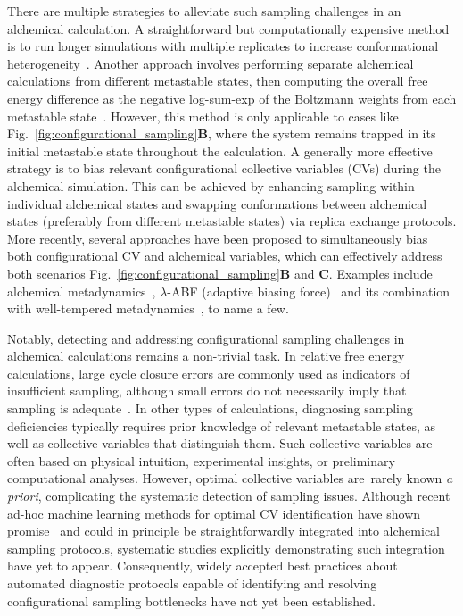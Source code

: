 \documentclass[9pt,bestpractices,pubversion]{livecoms}
\begin{document}
There are multiple strategies to alleviate such sampling challenges in an alchemical calculation. A straightforward but computationally expensive method is to run longer simulations with multiple replicates to increase conformational heterogeneity~\cite{suruzhon2021sensitivity}. Another approach involves performing separate alchemical calculations from different metastable states, then computing the overall free energy difference as the negative log-sum-exp of the Boltzmann weights from each metastable state~\cite{hsu2023alchemical}. However, this method is only applicable to cases like Fig.~\ref{fig:configurational_sampling}\textbf{B}, where the system remains trapped in its initial metastable state throughout the calculation. A generally more effective strategy is to bias relevant configurational collective variables (CVs) during the alchemical simulation. This can be achieved by enhancing sampling within individual alchemical states and swapping conformations between alchemical states (preferably from different metastable states) via replica exchange protocols. More recently, several approaches have been proposed to simultaneously bias both configurational CV and alchemical variables, which can effectively address both scenarios Fig.~\ref{fig:configurational_sampling}\textbf{B} and \textbf{C}. Examples include alchemical metadynamics~\cite{hsu2023alchemical}, $\lambda$-ABF (adaptive biasing force)~\cite{lagardere2024lambda} and its combination~\cite{zhou2025zooming} with well-tempered metadynamics~\cite{barducci2008well}, to name a few.  

Notably, detecting and addressing configurational sampling challenges in alchemical calculations remains a non-trivial task. In relative free energy calculations, large cycle closure errors are commonly used as indicators of insufficient sampling, although small errors do not necessarily imply that sampling is adequate~\cite{suruzhon2021sensitivity}. In other types of calculations, diagnosing sampling deficiencies typically requires prior knowledge of relevant metastable states, as well as collective variables that distinguish them. Such collective variables are often based on physical intuition, experimental insights, or preliminary computational analyses. However, optimal collective variables are rarely known \textit{a priori}, complicating the systematic detection of sampling issues. Although recent ad-hoc machine learning methods for optimal CV identification have shown promise~\cite{gokdemir2025machine, sidky2020machine, bonati2021deep} and could in principle be straightforwardly integrated into alchemical sampling protocols, systematic studies explicitly demonstrating such integration have yet to appear. Consequently, widely accepted best practices about automated diagnostic protocols capable of identifying and resolving configurational sampling bottlenecks have not yet been established. 
\end{document}
